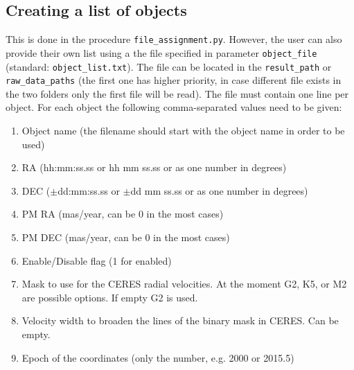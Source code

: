 \documentclass[10pt,a4paper]{article}
\begin{document}



\subsection{Creating a list of objects}
\label{Section:create_object_list_file}
This is done in the procedure \verb|file_assignment.py|. However, the user can also provide their own list using a the file specified in parameter \verb|object_file| (standard: \verb|object_list.txt|). The file can be located in the \verb|result_path| or \verb|raw_data_paths| (the first one has higher priority, in case different file exists in the two folders only the first file will be read). The file must contain one line per object. For each object the following comma-separated values need to be given:
\begin{enumerate}\setlength\itemsep{0em}
 \item Object name (the filename should start with the object name in order to be used)
 \item RA (hh:mm:ss.ss or hh mm ss.ss or as one number in degrees)
 \item DEC ($\pm$dd:mm:ss.ss or $\pm$dd mm ss.ss or as one number in degrees)
 \item PM RA (mas/year, can be 0 in the most cases)
 \item PM DEC (mas/year, can be 0 in the most cases)
 \item Enable/Disable flag (1 for enabled)
 \item Mask to use for the CERES radial velocities. At the moment G2, K5, or M2 are possible options. If empty G2 is used.
 \item Velocity width to broaden the lines of the binary mask in CERES. Can be empty.
 \item Epoch of the coordinates (only the number, e.g. 2000 or 2015.5)
\end{enumerate}
\end{document}
